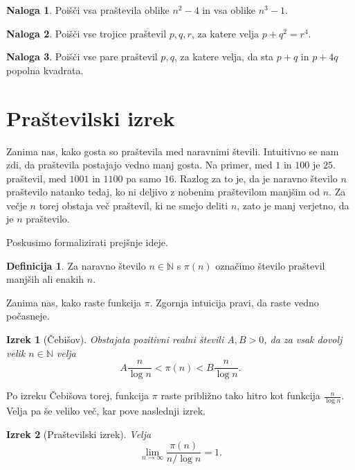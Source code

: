 \documentclass[a4paper,12pt]{article}
\def\N{\mathbb{N}}
\theoremstyle{definition}
\newtheorem{definicija}{Definicija}
\newtheorem{naloga}{Naloga}
\theoremstyle{plain}
\newtheorem{izrek}{Izrek}
\begin{document}
\begin{naloga}
    Poišči vsa praštevila oblike $n^2 - 4$ in vsa oblike $n^3 - 1$.
\end{naloga}
\begin{naloga}
    Poišči vse trojice praštevil $p, q, r$, za katere velja $p + q^2 = r^4$.
\end{naloga}
\begin{naloga}
    Poišči vse pare praštevil $p, q$, za katere velja, da sta $p + q$ in $p + 4q$ popolna kvadrata.
\end{naloga}



\section{Praštevilski izrek}
Zanima nas, kako gosta so praštevila med naravnimi števili. Intuitivno se nam zdi, da praštevila postajajo vedno manj gosta. Na primer, med $1$ in $100$ je $25$. praštevil, med $1001$ in $1100$ pa samo $16$. Razlog za to je, da je naravno število $n$ praštevilo natanko tedaj, ko ni deljivo z nobenim praštevilom manjšim od $n$. Za večje $n$ torej obstaja več praštevil, ki ne smejo deliti $n$, zato je manj verjetno, da je $n$ praštevilo.

Poskusimo formalizirati prejšnje ideje.
\begin{definicija}
    Za naravno število $n \in \N$ s $\pi(n)$ označimo število praštevil manjših ali enakih $n$.
\end{definicija}
Zanima nas, kako raste funkcija $\pi$. Zgornja intuicija pravi, da raste vedno počasneje.

\begin{izrek}[Čebišov]
    Obstajata pozitivni realni števili $A, B > 0$, da za vsak dovolj velik $n \in \N$ velja $$A\frac{n}{\log{n}} < \pi(n) < B\frac{n}{\log{n}}.$$
\end{izrek}

Po izreku Čebišova torej, funkcija $\pi$ raste približno tako hitro kot funkcija $\frac{n}{\log{n}}$. Velja pa še veliko več, kar pove naslednji izrek.

\begin{izrek}[Praštevilski izrek]
    Velja $$\lim_{n \rightarrow \infty} \frac{\pi(n)}{n / \log{n}} = 1.$$
\end{izrek}
\end{document}
